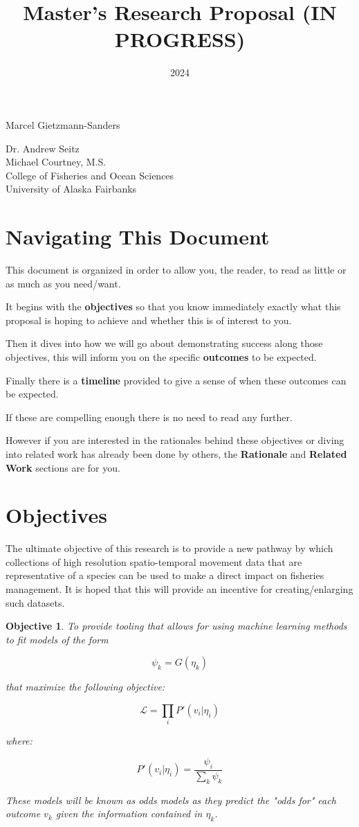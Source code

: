 \documentclass[11pt]{article}
\title{Master's Research Proposal (IN PROGRESS)}
\date{2024}
\makeatletter
\newtheorem{objective}{Objective}
\renewcommand{\maketitle}{
\begin{center}

\pagestyle{empty}
\phantom{.}  %
\vspace{3cm}

{\Huge \bf \@title\par}
\vspace{2.5cm}

{\LARGE Marcel Gietzmann-Sanders}\\[1cm]

{\Large\@date}

\vspace{2.5cm}
{\Large Dr. Andrew Seitz}\hspace{2cm}{\Large Dr. Curry Cunningham}\\[2cm]{\Large Michael Courtney, M.S.}\\[2cm]
College of Fisheries and Ocean Sciences\\
University of Alaska Fairbanks


\end{center}
}\makeatother
\makeatother
\begin{document}
\maketitle
\newpage

\section{Navigating This Document}

This document is organized in order to allow you, the reader, to read as little or as much as you need/want. \newline

It begins with the \textbf{objectives} so that you know immediately exactly what this proposal is hoping to achieve and whether this is of interest to you.  \newline

Then it dives into how we will go about demonstrating success along those objectives, this will inform you on the specific \textbf{outcomes} to be expected. \newline

Finally there is a \textbf{timeline} provided to give a sense of when these outcomes can be expected. \newline

If these are compelling enough there is no need to read any further. \newline

However if you are interested in the rationales behind these objectives or diving into related work has already been done by others, the \textbf{Rationale} and \textbf{Related Work} sections are for you. 

\newpage


\tableofcontents
\newpage

\section{Objectives}

The ultimate objective of this research is to provide a new pathway by which collections of high resolution spatio-temporal movement data that are representative of a species can be used to make a direct impact on fisheries management. It is hoped that this will provide an incentive for creating/enlarging such datasets. 

\begin{objective}
To provide tooling that allows for using machine learning methods to fit models of the form

$$\psi_k = G(\eta_k)$$

that maximize the following objective:


$$\mathcal{L}=\prod_i P'(v_i | \eta_i)$$

where:

$$P'(v_i|\eta_i) = \frac{\psi_i}{\sum_k \psi_k}$$

These models will be known as odds models as they predict the "odds for" each outcome $v_k$ given the information contained in $\eta_k$. 

\end{objective}
\end{document}
